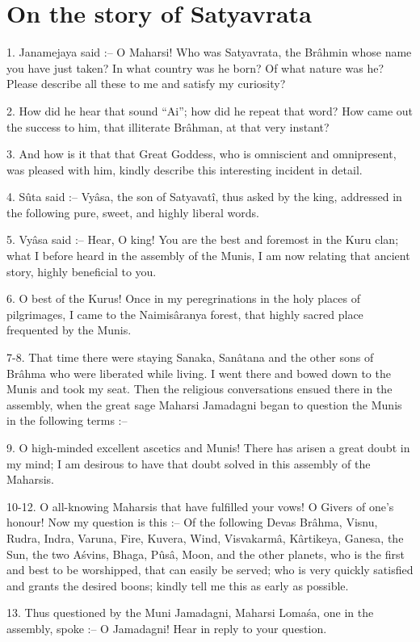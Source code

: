 ﻿\chapter{On the story of Satyavrata}

1. Janamejaya said :-- O Maharsi! Who was Satyavrata, the Br\^ahmin whose name you have just taken? In what country was he born? Of what nature was he? Please describe all these to me and satisfy my curiosity?

2. How did he hear that sound ``Ai''; how did he repeat that word? How came out the success to him, that illiterate Br\^ahman, at that very instant?

3. And how is it that that Great Goddess, who is omniscient and omnipresent, was pleased with him, kindly describe this interesting incident in detail.

4. Sûta said :-- Vy\^asa, the son of Satyavat\^i, thus asked by the king, addressed in the following pure, sweet, and highly liberal words.

5. Vy\^asa said :-- Hear, O king! You are the best and foremost in the Kuru clan; what I before heard in the assembly of the Munis, I am now relating that ancient story, highly beneficial to you.

6. O best of the Kurus! Once in my peregrinations in the holy places of pilgrimages, I came to the Naimis\^aranya forest, that highly sacred place frequented by the Munis.

7-8. That time there were staying Sanaka, San\^atana and the other sons of Br\^ahma who were liberated while living. I went there and bowed down to the Munis and took my seat. Then the religious conversations ensued there in the assembly, when the great sage Maharsi Jamadagni began to question the Munis in the following terms :--

9. O high-minded excellent ascetics and Munis! There has arisen a great doubt in my mind; I am desirous to have that doubt solved in this assembly of the Maharsis.

10-12. O all-knowing Maharsis that have fulfilled your vows! O Givers of one's honour! Now my question is this :-- Of the following Devas Br\^ahma, Visnu, Rudra, Indra, Varuna, Fire, Kuvera, Wind, Visvakarm\^a, K\^artikeya, Ganesa, the Sun, the two A\'svins, Bhaga, Pûs\^a, Moon, and the other planets, who is the first and best to be worshipped, that can easily be served; who is very quickly satisfied and grants the desired boons; kindly tell me this as early as possible.

13. Thus questioned by the Muni Jamadagni, Maharsi Loma\'sa, one in the assembly, spoke :-- O Jamadagni! Hear in reply to your question.

